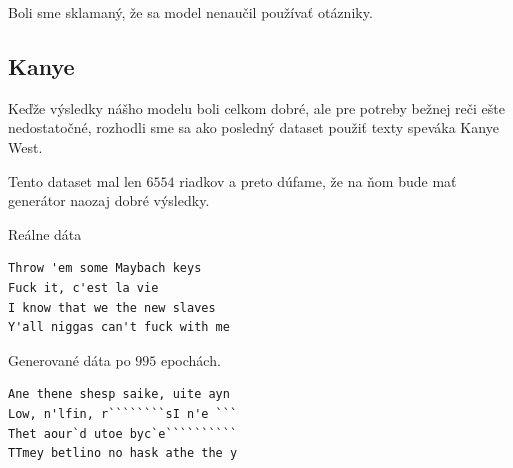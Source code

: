 \documentclass[10pt,a4paper]{article}
\begin{document}
Boli sme sklamaný, že sa model nenaučil používať otázniky.


\subsection{Kanye}
Keďže výsledky nášho modelu boli celkom dobré, ale pre potreby bežnej reči ešte nedostatočné, rozhodli sme sa ako posledný dataset použiť texty speváka Kanye West.

Tento dataset mal len $6554$ riadkov a preto dúfame, že na ňom bude mať generátor naozaj dobré výsledky.

Reálne dáta
\begin{verbatim}
Throw 'em some Maybach keys
Fuck it, c'est la vie
I know that we the new slaves
Y'all niggas can't fuck with me
\end{verbatim}

Generované dáta po $995$  epochách.
\begin{verbatim}
Ane thene shesp saike, uite ayn 
Low, n'lfin, r````````sI n'e ```
Thet aour`d utoe byc`e``````````
TTmey betlino no hask athe the y
\end{verbatim}
\end{document}
